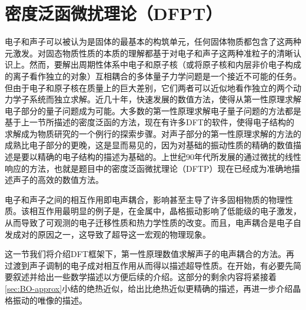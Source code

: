 \section{密度泛函微扰理论（DFPT）}

电子和声子可以被认为是固体的最基本的构筑单元，任何固体物质都包含了这两种元激发。对固态物质性质的本质的理解都基于对电子和声子这两种准粒子的清晰认识上。然而，要解出周期性体系中电子和原子核（或将原子核和内层非价电子构成的离子看作独立的对象）互相耦合的多体量子力学问题是一个接近不可能的任务。但由于电子和原子核在质量上的巨大差别，它们两者可以近似地看作独立的两个动力学子系统而独立求解。近几十年，快速发展的数值方法，使得从第一性原理求解电子部分的量子问题成为可能。大多数的第一性原理求解电子量子问题的方法都是基于上一节所描述的密度泛函的方法，现在有许多DFT的软件，使得电子结构的求解成为物质研究的一个例行的探索步骤。对声子部分的第一性原理求解的方法的成熟比电子部分的更晚，这是显而易见的，因为对基础的振动性质的精确的数值描述是要以精确的电子结构的描述为基础的。上世纪90年代所发展的通过微扰的线性响应的方法，也就是题目中的密度泛函微扰理论（DFTP）现在已经成为准确地描述声子的高效的数值方法。

电子和声子之间的相互作用即电声耦合，影响甚至主导了许多固相物质的物理性质。该相互作用最明显的例子是，在金属中，晶格振动影响了低能级的电子激发，从而导致了可观测的电子迁移性质和热力学性质的改变。而且，电声耦合是电子自发成对的原因之一，这导致了超导这一宏观的物理现象。

这一节我们将介绍DFT框架下，第一性原理数值求解声子的电声耦合的方法。再过渡到声子调制的电子成对相互作用从而得以描述超导性质。在开始，有必要先简要叙述并给出一些数学描述以方便后续的介绍。这部分的剩余内容将紧接着\ref{sec:BO-approx}小结的绝热近似，给出比绝热近似更精确的描述，再进一步介绍晶格振动的唯像的描述。


